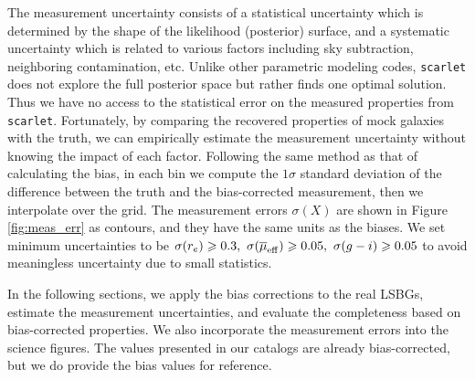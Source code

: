 \documentclass[twocolumn,astrosymb,twocolappendix]{aastex631}
\newcommand{\code}[1]{\texttt{#1}}
\newcommand{\sersic}{S\'ersic}
\begin{document}
\begin{CJK*}{UTF8}{gbsn}
The measurement uncertainty consists of a statistical uncertainty which is determined by the shape of the likelihood (posterior) surface, and a systematic uncertainty which is related to various factors including sky subtraction, neighboring contamination, etc. Unlike other parametric modeling codes, \code{scarlet} does not explore the full posterior space but rather finds one optimal solution. Thus we have no access to the statistical error on the measured properties from \code{scarlet}. Fortunately, by comparing the recovered properties of mock galaxies with the truth, we can empirically estimate the measurement uncertainty without knowing the impact of each factor. Following the same method as that of calculating the bias, in each bin we compute the $1\sigma$ standard deviation of the difference between the truth and the bias-corrected measurement, then we interpolate over the grid. The measurement errors $\sigma(X)$ are shown in Figure \ref{fig:meas_err} as contours, and they have the same units as the biases. We set minimum uncertainties to be $\sigma(r_e) \geqslant 0.3,\ \sigma(\overline{\mu}_{\rm eff}) \geqslant 0.05,\ \sigma(g-i) \geqslant 0.05$ to avoid meaningless uncertainty due to small statistics.

In the following sections, we apply the bias corrections to the real LSBGs, estimate the measurement uncertainties, and evaluate the completeness based on bias-corrected properties. We also incorporate the measurement errors into the science figures. The values presented in our catalogs are already bias-corrected, but we do provide the bias values for reference. 






\end{CJK*}
\end{document}

